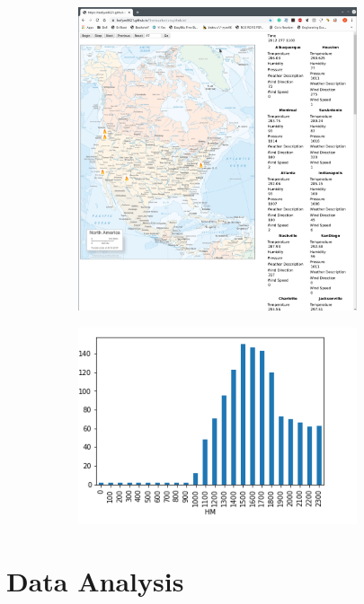 \documentclass{article}
\begin{document}
\begin{figure}[H]
\begin{subfigure}[t]{0.45\textwidth}
        \includegraphics[width=0.9\textwidth]
        {../../visualization/screenshot.png}
    \end{subfigure}
    \begin{subfigure}[t]{0.45\textwidth}
        \includegraphics[width=0.9\textwidth]{sanfrancisco_hour.png}
    \end{subfigure}
\end{figure}

\section{Data Analysis}
\end{document}
